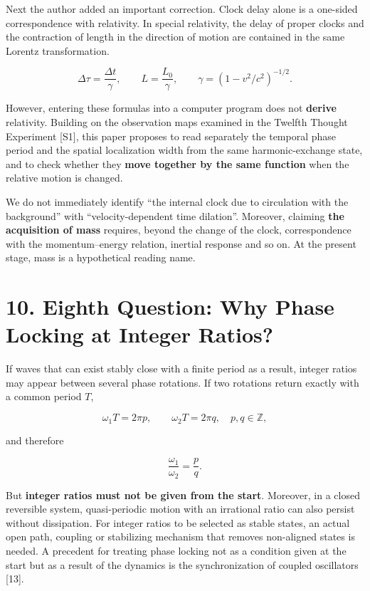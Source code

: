 \documentclass[
  a4paper,
]{article}
\begin{document}
Next the author added an important correction. Clock delay alone is a
one-sided correspondence with relativity. In special relativity, the
delay of proper clocks and the contraction of length in the direction of
motion are contained in the same Lorentz transformation.

\[
\Delta\tau=\frac{\Delta t}{\gamma},\qquad
L=\frac{L_0}{\gamma},\qquad
\gamma=(1-v^2/c^2)^{-1/2}.
\]

However, entering these formulas into a computer program does not
\textbf{derive} relativity. Building on the observation maps examined in
the Twelfth Thought Experiment {[}S1{]}, this paper proposes to read
separately the temporal phase period and the spatial localization width
from the same harmonic-exchange state, and to check whether they
\textbf{move together by the same function} when the relative motion is
changed.

We do not immediately identify ``the internal clock due to circulation
with the background'' with ``velocity-dependent time dilation''.
Moreover, claiming \textbf{the acquisition of mass} requires, beyond the
change of the clock, correspondence with the momentum--energy relation,
inertial response and so on. At the present stage, mass is a
hypothetical reading name.

\section{10. Eighth Question: Why Phase Locking at Integer
Ratios?}\label{eighth-question-why-phase-locking-at-integer-ratios}

If waves that can exist stably close with a finite period as a result,
integer ratios may appear between several phase rotations. If two
rotations return exactly with a common period \(T\),

\[
\omega_1T=2\pi p,\qquad
\omega_2T=2\pi q,
\quad p,q\in\mathbb Z,
\]

and therefore

\[
\frac{\omega_1}{\omega_2}=\frac pq.
\]

But \textbf{integer ratios must not be given from the start}. Moreover,
in a closed reversible system, quasi-periodic motion with an irrational
ratio can also persist without dissipation. For integer ratios to be
selected as stable states, an actual open path, coupling or stabilizing
mechanism that removes non-aligned states is needed. A precedent for
treating phase locking not as a condition given at the start but as a
result of the dynamics is the synchronization of coupled oscillators
{[}13{]}.
\end{document}

